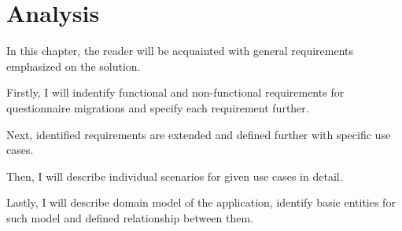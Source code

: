 \chapter{Analysis}\label{cptr:analysis}

In this chapter, the reader will be acquainted with general requirements emphasized on the solution.

Firstly, I will indentify functional and non-functional requirements for questionnaire migrations and specify each requirement further.

Next, identified requirements are extended and defined further with specific use cases.

Then, I will describe individual scenarios for given use cases in detail.

Lastly, I will describe domain model of the application, identify basic entities for such model and defined relationship between them.





